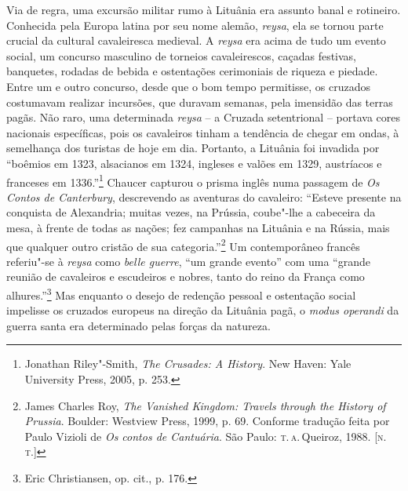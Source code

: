 Via de regra, uma excursão militar rumo à Lituânia era assunto banal e
rotineiro. Conhecida pela Europa latina por seu nome alemão,
\textit{reysa}, ela se tornou parte crucial da cultural cavaleiresca
medieval. A \textit{reysa} era acima de tudo um evento social, um concurso
masculino de torneios cavaleirescos, caçadas festivas, banquetes,
rodadas de bebida e ostentações cerimoniais de riqueza e piedade. Entre
um e outro concurso, desde que o bom tempo permitisse, os cruzados
costumavam realizar incursões, que duravam semanas, pela imensidão das
terras pagãs. Não raro, uma determinada \textit{reysa} -- a Cruzada
setentrional -- portava cores nacionais específicas, pois os cavaleiros
tinham a tendência de chegar em ondas, à semelhança dos turistas de hoje
em dia. Portanto, a Lituânia foi invadida por ``boêmios em 1323,
alsacianos em 1324, ingleses e valões em 1329, austríacos e
franceses em 1336.''\footnote{Jonathan Riley"-Smith, \textit{The Crusades: A History}. New Haven: Yale University Press, 2005, p. 253.} Chaucer capturou o prisma inglês numa passagem de \textit{Os Contos de
Canterbury}, descrevendo as aventuras do cavaleiro: ``Esteve presente na
conquista de Alexandria; muitas vezes, na Prússia, coube"-lhe a cabeceira
da mesa, à frente de todas as nações; fez campanhas na Lituânia e na
Rússia, mais que qualquer outro cristão de sua categoria.''\footnote{James Charles Roy, \textit{The Vanished Kingdom: Travels through the History of Prussia}. Boulder: Westview Press, 1999, p. 69. Conforme tradução feita por Paulo Vizioli de \textit{Os contos de Cantuária}. São Paulo: \textsc{t.\,a.}\,Queiroz, 1988. [\textsc{n.\,t.}]} Um contemporâneo francês referiu"-se à \textit{reysa} como \textit{belle guerre}, ``um grande evento''
com uma ``grande reunião de cavaleiros e escudeiros e nobres, tanto do
reino da França como alhures.''\footnote{Eric Christiansen, op. cit., p. 176.} Mas enquanto o desejo de redenção pessoal e ostentação social impelisse os cruzados europeus na direção da
Lituânia pagã, o \textit{modus operandi} da guerra santa era determinado
pelas forças da natureza.


